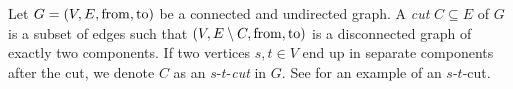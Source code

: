 

\begin{definition}[Cut]
    Let $G = (V, E, \operatorname{from}, \operatorname{to})$ be a connected and undirected graph. A \emph{cut} $C \subseteq E$ of $G$ is a subset of edges such that $(V, E \setminus C, \operatorname{from}, \operatorname{to})$ is a disconnected graph of exactly two components. If two vertices $s,t \in V$ end up in separate components after the cut, we denote $C$ as an $s$-$t$-\emph{cut} in $G$. See  for an example of an $s$-$t$-cut.
\end{definition}

